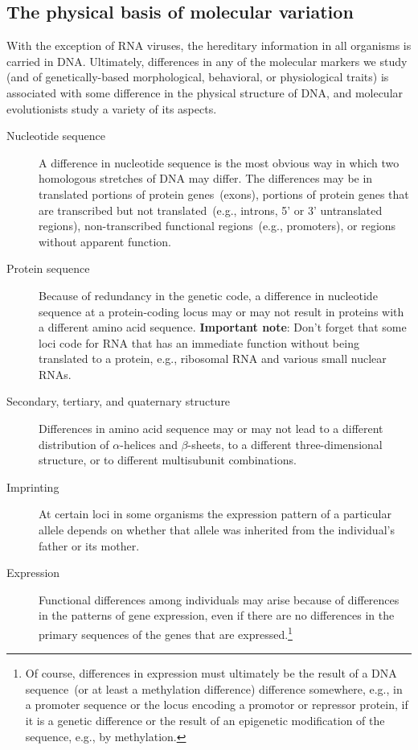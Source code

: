 \documentclass[12pt]{article}
\begin{document}
\subsection*{The physical basis of molecular variation}

With the exception of RNA viruses, the hereditary information in all
organisms is carried in DNA. Ultimately, differences in any of the
molecular markers we study (and of genetically-based morphological,
behavioral, or physiological traits) is associated with some
difference in the physical structure of DNA, and molecular
evolutionists study a variety of its aspects.

\begin{description}

\item[Nucleotide sequence] A difference in nucleotide sequence is the
  most obvious way in which two homologous stretches of DNA may
  differ. The differences may be in translated portions of protein
  genes~(exons), portions of protein genes that are transcribed but
  not translated~(e.g., introns, 5' or 3' untranslated regions),
  non-transcribed functional regions~(e.g., promoters), or regions
  without apparent function.

\item[Protein sequence] Because of redundancy in the genetic code, a
  difference in nucleotide sequence at a protein-coding locus may or
  may not result in proteins with a different amino acid
  sequence. {\bf Important note}: Don't forget that some loci code for
  RNA that has an immediate function without being translated to a
  protein, e.g., ribosomal RNA and various small nuclear RNAs.

\item[Secondary, tertiary, and quaternary structure] Differences in
  amino acid sequence may or may not lead to a different distribution
  of $\alpha$-helices and $\beta$-sheets, to a different
  three-dimensional structure, or to different multisubunit
  combinations.

\item[Imprinting] At certain loci in some organisms the expression
  pattern of a particular allele depends on whether that allele was
  inherited from the individual's father or its mother.

\item[Expression] Functional differences among individuals may arise
  because of differences in the patterns of gene expression, even if
  there are no differences in the primary sequences of the genes that
  are expressed.\footnote{Of course, differences in expression must
    ultimately be the result of a DNA sequence~(or at least a
    methylation difference) difference somewhere, e.g., in a promoter
    sequence or the locus encoding a promotor or repressor protein, if
    it is a genetic difference or the result of an epigenetic
    modification of the sequence, e.g., by methylation.}


\end{description}
\end{document}
